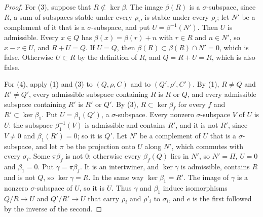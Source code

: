 \begin{proof}
For (3), suppose that $R\not\subset\ker\beta$. The image $\beta(R)$ is a
$\sigma$-subspace, since $R$, a sum of subspaces stable under every $\rho_i$,
is stable under every $\rho_i$; let $N'$ be a complement of it that is a
$\sigma$-subspace, and put $U=\beta^{-1}(N')$. Then $U$ is admissible. Every
$x\in Q$ has $\beta(x)=\beta(r)+n$ with $r\in R$ and $n\in N'$, so $x-r\in U$,
and $R+U=Q$. If $U=Q$, then $\beta(R)\subset\beta(R)\cap N'=0$, which is
false. Otherwise $U\subset R$ by the definition of $R$, and $Q=R+U=R$, which
is also false.

For (4), apply (1) and (3) to $(Q,\rho,C)$ and to $(Q',\rho',C')$. By (1),
$R\neq Q$ and $R'\neq Q'$, every admissible subspace containing $R$ is $R$ or
$Q$, and every admissible subspace containing $R'$ is $R'$ or $Q'$. By (3),
$R\subset\ker\beta_f$ for every $f$ and $R'\subset\ker\beta_1$. Put
$U=\beta_1(Q')$, a $\sigma$-subspace. Every nonzero $\sigma$-subspace $V$ of
$U$ is $U$: the subspace $\beta_1^{-1}(V)$ is admissible and contains $R'$, and
it is not $R'$, since $V\neq0$ and $\beta_1(R')=0$; so it is $Q'$. Let $N'$ be
a complement of $U$ that is a $\sigma$-subspace, and let $\pi$ be the
projection onto $U$ along $N'$, which commutes with every $\sigma_i$. Some
$\pi\beta_f$ is not $0$: otherwise every $\beta_f(Q)$ lies in $N'$, so
$N'=\Pi$, $U=0$ and $\beta_1=0$. Put $\gamma=\pi\beta_f$. It is an
intertwiner, and $\ker\gamma$ is admissible, contains $R$ and is not $Q$, so
$\ker\gamma=R$. In the same way $\ker\beta_1=R'$. The image of $\gamma$ is a
nonzero $\sigma$-subspace of $U$, so it is $U$. Thus $\gamma$ and $\beta_1$
induce isomorphisms $Q/R\to U$ and $Q'/R'\to U$ that carry $\bar\rho_i$ and
$\bar\rho'_i$ to $\sigma_i$, and $e$ is the first followed by the inverse of
the second.
\end{proof}

